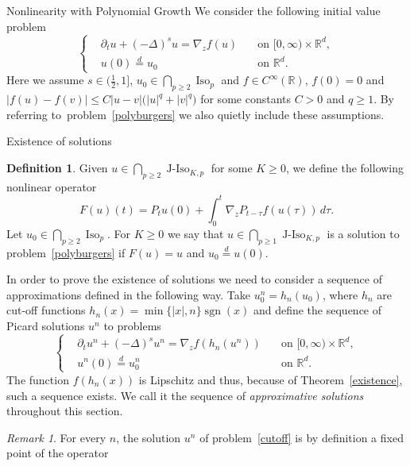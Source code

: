 \documentclass[a4paper,10pt,fleqn]{amsart}
\theoremstyle{remark}
\newtheorem{remark}[theorem]{Remark}
\theoremstyle{definition}
\newtheorem{definition}[theorem]{Definition}
\DeclareMathOperator{\Iso}{Iso}
\DeclareMathOperator{\JIso}{J-Iso}
\DeclareMathOperator{\sgn}{sgn}
\newcommand{\dt} {\partial_t}
\newcommand{\grad} {\nabla_{\!z}}
\newcommand{\X} {{\mathbb{R}^d}}
\newcommand{\R} {\mathbb{R}}
\newcommand{\T} {[0,\infty)}
\renewcommand{\=} {\overset{d}{=}}
\newcommand{\fLap} {(-\Delta)^s}
\begin{document}
\begin{section}{Nonlinearity with Polynomial Growth}\label{general}
    We consider the following initial value problem
     \begin{equation}\label{polyburgers}
      \left\{
      \begin{aligned}
        &\dt u + \fLap u = \grad f(u)\quad&\text{on $\T\times\X$}, \\
        &u(0) \= u_0\quad&\text{on $\X$}.
      \end{aligned}
      \right.
    \end{equation}
    Here we assume $s\in(\frac{1}{2},1]$, $u_0\in\bigcap_{p\geq2}\Iso_p$ and $f\in C^\infty(\R)$, $f(0)=0$ and $|f(u)-f(v)|\leq C|u-v|\big(|u|^q+|v|^q\big)$
    for some constants $C>0$ and $q\geq 1$.
    By referring to~problem~\eqref{polyburgers} we also quietly include these assumptions.
    \begin{subsection}{Existence of solutions}
      \begin{definition}\label{polydefinition}
          Given $u\in\bigcap_{p\geq2}\JIso_{K,p}$ for some $K\geq 0$, we define the following nonlinear operator
  \begin{equation*}
    F(u)(t) = P_{t}u(0) + \int_0^{t} \grad P_{t-\tau} f(u(\tau))\,d\tau.
  \end{equation*} 
   Let $u_0\in\bigcap_{p\geq2}\Iso_p$. For $K\geq0$ we say that $u\in\bigcap_{p\geq1}\JIso_{K,p}$ is a solution to problem~\eqref{polyburgers} if $F(u)=u$ and $u_0\=u(0)$.
  \end{definition}
  In order to prove the existence of solutions we need to consider a sequence of approximations
  defined in the following way. Take $u_0^n = h_n(u_0)$, where $h_n$ are cut-off functions $h_n(x) = \min\{|x|,n\}\sgn(x)$ and define the sequence of Picard solutions $u^n$ to problems
  \begin{equation}\label{cutoff}
      \left\{
      \begin{aligned}
        &\dt u^n + \fLap u^n = \grad f(h_n(u^n))\quad&\text{on $\T\times\X$}, \\
        &u^n(0) \= u_0^n\quad&\text{on $\X$}.
      \end{aligned}
      \right.
    \end{equation}
    The function $f(h_n(x))$ is Lipschitz and thus, because of Theorem~\ref{existence}, such a sequence exists.
    We call it the sequence of \emph{approximative solutions} throughout this section.
    \begin{remark}
     For every $n$, the solution $u^n$ of problem~\eqref{cutoff} is by definition a fixed point of the operator

\end{remark}
\end{subsection}
\end{section}
\end{document}
